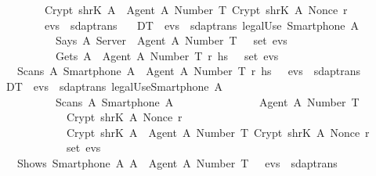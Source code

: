 \begin{isabellebody}
  \ \ \ \ \ \ \ \ \ \ Crypt\ {\isacharparenleft}shrK\ A{\isacharparenright}\ {\isasymlbrace}\ {\isasymlbrace}Agent\ A{\isacharcomma}\ Number\ T{\isasymrbrace}{\isacharcomma}\ Crypt\ {\isacharparenleft}shrK\ A{\isacharparenright}\ {\isacharparenleft}Nonce\ r{\isacharparenright}\ {\isasymrbrace}\isanewline
  \ \ \ \ \ \ \ \ {\isasymrbrace}\ {\isacharhash}\ evs{}\ {\isasymin}\ sdaptrans{\isachardoublequoteclose}\isanewline
  \isanewline
  \ \ {\isacharbar}\ DT{}{\isacharcolon}\ {\isachardoublequoteopen}{\isasymlbrakk}\ evs{}\ {\isasymin}\ sdaptrans{\isacharsemicolon}\ legalUse\ {\isacharparenleft}Smartphone\ A{\isacharparenright}{\isacharsemicolon}\isanewline
  \ \ \ \ \ \ \ \ \ \ \ \ Says\ A\ Server\ {\isasymlbrace}\ Agent\ A{\isacharcomma}\ Number\ T\ {\isasymrbrace}\ {\isasymin}\ set\ evs{}{\isacharsemicolon}\isanewline
  \ \ \ \ \ \ \ \ \ \ \ \ Gets\ A\ {\isasymlbrace}\ {\isasymlbrace}Agent\ A{\isacharcomma}\ Number\ T{\isasymrbrace}{\isacharcomma}\ r{\isacharprime}{\isacharcomma}\ h\isactrlsub s\ {\isasymrbrace}\ {\isasymin}\ set\ evs{}\ {\isasymrbrakk}\isanewline
  \ \ \ \ {\isasymLongrightarrow}\ Scans\ A\ {\isacharparenleft}Smartphone\ A{\isacharparenright}\ {\isasymlbrace}\ {\isasymlbrace}Agent\ A{\isacharcomma}\ Number\ T{\isasymrbrace}{\isacharcomma}\ r{\isacharprime}{\isacharcomma}\ h\isactrlsub s\ {\isasymrbrace}\ {\isacharhash}\ evs{}\ {\isasymin}\ sdaptrans{\isachardoublequoteclose}\isanewline
  \isanewline
  \ \ {\isacharbar}\ DT{}{\isacharcolon}\ {\isachardoublequoteopen}{\isasymlbrakk}\ evs{}\ {\isasymin}\ sdaptrans{\isacharsemicolon}\ legalUse{\isacharparenleft}Smartphone\ A{\isacharparenright}{\isacharsemicolon}\isanewline
  \ \ \ \ \ \ \ \ \ \ \ \ Scans\ A\ {\isacharparenleft}Smartphone\ A{\isacharparenright}\ {\isasymlbrace}\isanewline
  \ \ \ \ \ \ \ \ \ \ \ \ \ \ {\isasymlbrace}Agent\ A{\isacharcomma}\ Number\ T{\isasymrbrace}{\isacharcomma}\isanewline
  \ \ \ \ \ \ \ \ \ \ \ \ \ \ Crypt\ {\isacharparenleft}shrK\ A{\isacharparenright}\ {\isacharparenleft}Nonce\ r{\isacharparenright}{\isacharcomma}\isanewline
  \ \ \ \ \ \ \ \ \ \ \ \ \ \ Crypt\ {\isacharparenleft}shrK\ A{\isacharparenright}\ {\isasymlbrace}\ {\isasymlbrace}Agent\ A{\isacharcomma}\ Number\ T{\isasymrbrace}{\isacharcomma}\ Crypt\ {\isacharparenleft}shrK\ A{\isacharparenright}\ {\isacharparenleft}Nonce\ r{\isacharparenright}\ {\isasymrbrace}\isanewline
  \ \ \ \ \ \ \ \ \ \ \ \ {\isasymrbrace}\ {\isasymin}\ set\ evs{}\ {\isasymrbrakk}\isanewline
  \ \ \ \ {\isasymLongrightarrow}\ Shows\ {\isacharparenleft}Smartphone\ A{\isacharparenright}\ A\ {\isasymlbrace}\ Agent\ A{\isacharcomma}\ Number\ T\ {\isasymrbrace}\ {\isacharhash}\ evs{}\ {\isasymin}\ sdaptrans{\isachardoublequoteclose}\isanewline

\end{isabellebody}
